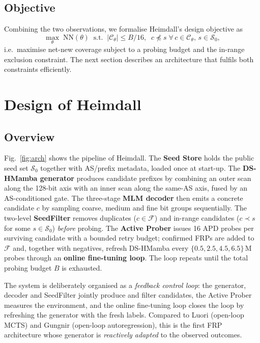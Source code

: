 \documentclass[conference]{IEEEtran}
\begin{document}
\subsection{Objective}
Combining the two observations, we formalise Heimdall's design
objective as
\begin{equation}
\max_{\theta}\; \mathrm{NN}(\theta) \;\;
\text{s.t.}\;\; |\mathcal{C}_\theta|\!\le\!B/16,\;\;
c\not\preceq s\;\forall\,c\!\in\!\mathcal{C}_\theta,\,
s\!\in\!\mathcal{S}_{0},
\label{eq:obj}
\end{equation}
i.e.\ maximise net-new coverage subject to a probing budget
and the in-range exclusion constraint.  The next section
describes an architecture that fulfils both constraints
efficiently.


\section{Design of Heimdall}\label{sec:design}

\subsection{Overview}\label{sec:design:overview}
Fig.~\ref{fig:arch} shows the pipeline of Heimdall.
The \textbf{Seed Store} holds the public seed set $\mathcal{S}_{0}$
together with AS/prefix metadata, loaded once at start-up.
The \textbf{DS-HMamba generator} produces candidate prefixes by
combining an outer scan along the 128-bit axis with an inner scan
along the same-AS axis, fused by an AS-conditioned gate.
The three-stage \textbf{MLM decoder} then emits a concrete
candidate $c$ by sampling coarse, medium and fine bit groups
sequentially.
The two-level \textbf{SeedFilter} removes duplicates
($c\!\in\!\mathcal{F}$) and in-range candidates
($c\!\prec\!s$ for some $s\!\in\!\mathcal{S}_{0}$)
\emph{before} probing.
The \textbf{Active Prober} issues 16 APD probes per surviving
candidate with a bounded retry budget; confirmed FRPs are added
to $\mathcal{F}$ and, together with negatives, refresh DS-HMamba
every $\{0.5,2.5,4.5,6.5\}$\,M probes through an \textbf{online
fine-tuning loop}.  The loop repeats until the total probing
budget $B$ is exhausted.

The system is deliberately organised as a
\emph{feedback control loop}: the generator, decoder and
SeedFilter jointly produce and filter candidates, the Active
Prober measures the environment, and the online fine-tuning
loop closes the loop by refreshing the generator with the fresh
labels.  Compared to Luori (open-loop MCTS) and Gungnir
(open-loop autoregression), this is the first FRP architecture
whose generator is \emph{reactively adapted} to the observed
outcomes.
\end{document}
